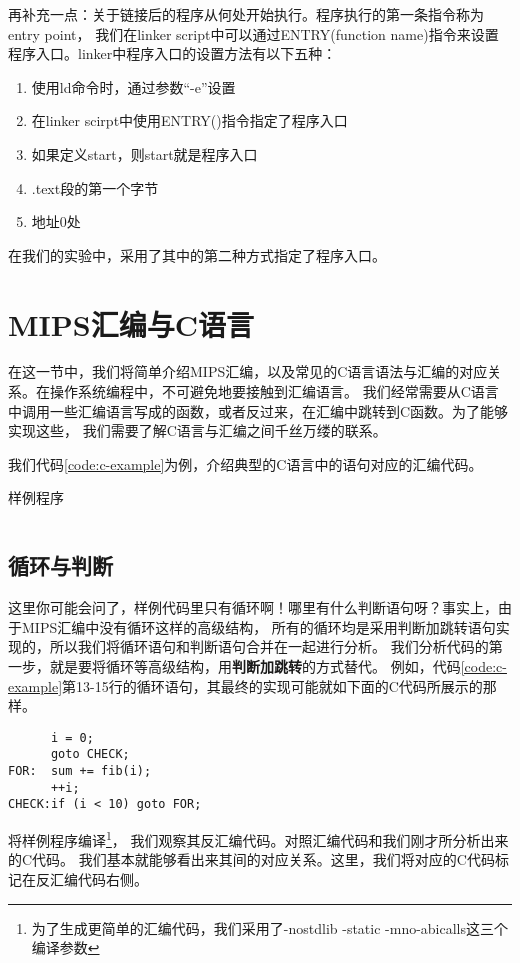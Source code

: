 再补充一点：关于链接后的程序从何处开始执行。程序执行的第一条指令称为entry point，
我们在linker script中可以通过ENTRY(function name)指令来设置程序入口。linker中程序入口的设置方法有以下五种：
\begin{enumerate}
  \item 使用ld命令时，通过参数“-e”设置
  \item 在linker scirpt中使用ENTRY()指令指定了程序入口
  \item 如果定义start，则start就是程序入口
  \item .text段的第一个字节
  \item 地址0处
\end{enumerate}
在我们的实验中，采用了其中的第二种方式指定了程序入口。

\section{MIPS汇编与C语言}
在这一节中，我们将简单介绍MIPS汇编，以及常见的C语言语法与汇编的对应关系。在操作系统编程中，不可避免地要接触到汇编语言。
我们经常需要从C语言中调用一些汇编语言写成的函数，或者反过来，在汇编中跳转到C函数。为了能够实现这些，
我们需要了解C语言与汇编之间千丝万缕的联系。

我们代码\ref{code:c-example}为例，介绍典型的C语言中的语句对应的汇编代码。

\begin{codeBoxWithCaption}{样例程序\label{code:c-example}}
  \inputminted[linenos]{c}{codes/example.c}
\end{codeBoxWithCaption}

\subsection{循环与判断}
这里你可能会问了，样例代码里只有循环啊！哪里有什么判断语句呀？事实上，由于MIPS汇编中没有循环这样的高级结构，
所有的循环均是采用判断加跳转语句实现的，所以我们将循环语句和判断语句合并在一起进行分析。
我们分析代码的第一步，就是要将循环等高级结构，用\textbf{判断加跳转}的方式替代。
例如，代码\ref{code:c-example}第13-15行的循环语句，其最终的实现可能就如下面的C代码所展示的那样。

\begin{verbatim}
      i = 0;
      goto CHECK;
FOR:  sum += fib(i);
      ++i;
CHECK:if (i < 10) goto FOR;
\end{verbatim}

将样例程序编译\footnote{为了生成更简单的汇编代码，我们采用了-nostdlib -static -mno-abicalls这三个编译参数}，
我们观察其反汇编代码。对照汇编代码和我们刚才所分析出来的C代码。
我们基本就能够看出来其间的对应关系。这里，我们将对应的C代码标记在反汇编代码右侧。

